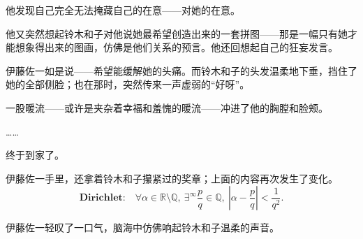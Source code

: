 他发现自己完全无法掩藏自己的在意——对她的在意。

他又突然想起铃木和子对他说她最希望创造出来的一套拼图——那是一幅只有她才能想象得出来的图画，仿佛是他们关系的预言。他还回想起自己的狂妄发言。

伊藤佐一如是说——希望能缓解她的头痛。而铃木和子的头发温柔地下垂，挡住了她的全部侧脸；也在那时，突然传来一声虚弱的“好呀”。

一股暖流——或许是夹杂着幸福和羞愧的暖流——冲进了他的胸膛和脸颊。

……

终于到家了。

伊藤佐一手里，还拿着铃木和子攥紧过的奖章；上面的内容再次发生了变化。
\begin{equation*}
    \textbf{Dirichlet:} \quad \forall \alpha \in \mathbb{R} \setminus \mathbb{Q},\ \exists^\infty \frac{p}{q} \in \mathbb{Q},\ \left| \alpha - \frac{p}{q} \right| < \frac{1}{q^2}.
\end{equation*}

伊藤佐一轻叹了一口气，脑海中仿佛响起铃木和子温柔的声音。












